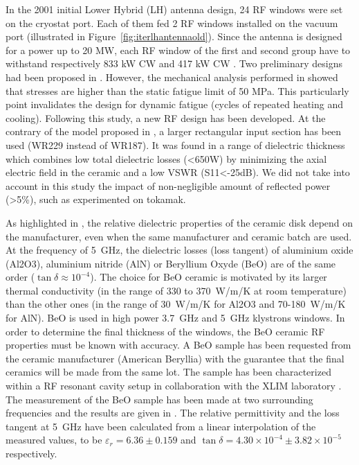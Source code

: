 {In the 2001 initial Lower Hybrid (LH) antenna design, 24 RF windows were set on the cryostat port. Each of them fed 2 RF windows installed on the vacuum port (illustrated in Figure~\ref{fig:iterlhantennaold}). Since the antenna is designed for a power up to 20 MW, each RF window of the first and second group have to withstand respectively 833 kW CW and 417 kW CW . Two preliminary designs had been proposed in . However, the mechanical analysis performed in  showed that stresses are higher than the static fatigue limit of 50 MPa. This particularly point invalidates the design for dynamic fatigue (cycles of repeated heating and cooling). Following this study, a new RF design has been developed. At the contrary of the model proposed in \cite{bibet2001-1}, a larger rectangular input section has been used (WR229 instead of WR187). It was found in  a range of dielectric thickness which combines low total dielectric losses (<650W) by minimizing the axial electric field in the ceramic and a low VSWR (S11<-25dB). We did not take into account in this study the impact of non-negligible amount of reflected power (>5\%), such as experimented on tokamak.

As highlighted in , the relative dielectric properties of the ceramic disk depend on the manufacturer, even when the same manufacturer and ceramic batch are used. At the frequency of 5~GHz, the dielectric losses (loss tangent) of aluminium oxide (Al2O3), aluminium nitride (AlN) or Beryllium Oxyde (BeO) are of the same order ($\tan\delta \approx 10^{-4}$). The choice for BeO ceramic is motivated by its larger thermal conductivity (in the range of 330 to 370~\si{W/m/K} at room temperature) than the other ones (in the range of 30~\si{W/m/K} for Al2O3 and 70-180~\si{W/m/K} for AlN). BeO is used in high power 3.7~GHz and 5~GHz klystrons windows. In order to determine the final thickness of the windows, the BeO ceramic RF properties must be known with accuracy. A BeO sample has been requested from the ceramic manufacturer (American Beryllia) with the guarantee that the final ceramics will be made from the same lot. The sample has been characterized within a RF resonant cavity setup in collaboration with the XLIM laboratory . The measurement of the BeO sample has been made at two surrounding frequencies and the results are given in \cite{hillairet2015}. The relative permittivity and the loss tangent at 5~GHz have been calculated from a linear interpolation of the measured values, to be $\varepsilon_{r}=6.36\pm0.159$ and $\tan \delta = 4.30\times 10^{-4}\pm3.82\times 10^{-5}$ respectively. 

}

